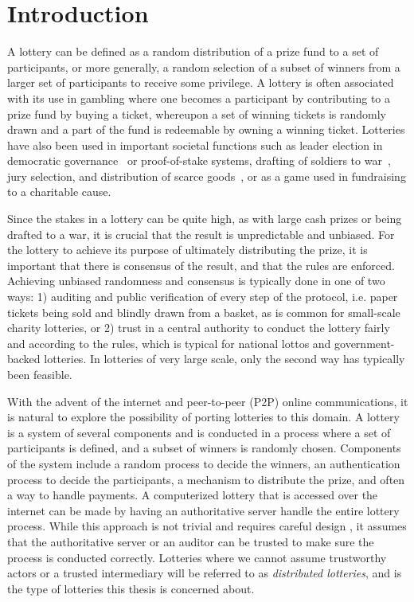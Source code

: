 \chapter{Introduction}
\label{chap:introduction}

A lottery can be defined as a random distribution of a prize fund to a set of participants, or more generally, a random selection of a subset of winners from a larger set of participants to receive some privilege. A lottery is often associated with its use in gambling where one becomes a participant by contributing to a prize fund by buying a ticket, whereupon a set of winning tickets is randomly drawn and a part of the fund is redeemable by owning a winning ticket. Lotteries have also been used in important societal functions such as leader election in democratic governance~\cite{sintomer_random_2010} or proof-of-stake systems, drafting of soldiers to war~\cite{nixon_executive_1969}, jury selection, and distribution of scarce goods~\cite{the_economist_why_2018}, or as a game used in fundraising to a charitable cause. 

Since the stakes in a lottery can be quite high, as with large cash prizes or being drafted to a war, it is crucial that the result is unpredictable and unbiased. For the lottery to achieve its purpose of ultimately distributing the prize, it is important that there is consensus of the result, and that the rules are enforced. Achieving unbiased randomness and consensus is typically done in one of two ways: 1) auditing and public verification of every step of the protocol, i.e. paper tickets being sold and blindly drawn from a basket, as is common for small-scale charity lotteries, or 2) trust in a central authority to conduct the lottery fairly and according to the rules, which is typical for national lottos and government-backed lotteries. In lotteries of very large scale, only the second way has typically been feasible.

With the advent of the internet and peer-to-peer (P2P) online communications, it is natural to explore the possibility of porting lotteries to this domain. A lottery is a system of several components and is conducted in a process where a set of participants is defined, and a subset of winners is randomly chosen. Components of the system include a random process to decide the winners, an authentication process to decide the participants, a mechanism to distribute the prize, and often a way to handle payments.  A computerized lottery that is accessed over the internet can be made by having an authoritative server handle the entire lottery process. While this approach is not trivial and requires careful design \cite{sako_implementation_1999, konstantinou_electronic_2004, konstantinou_trust_2005, chen_design_2005, kuacharoen_design_2012, chen_novel_2016}, it assumes that the authoritative server or an auditor can be trusted to make sure the process is conducted correctly. Lotteries where we cannot assume trustworthy actors or a trusted intermediary will be referred to as \emph{distributed lotteries}, and is the type of lotteries this thesis is concerned about.

